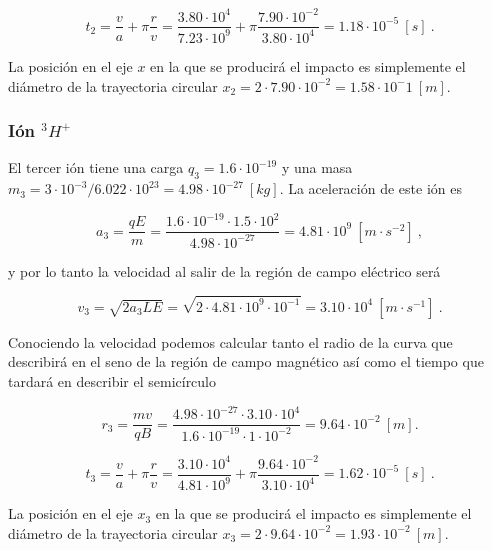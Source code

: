 \documentclass[journal]{IEEEtran}
\begin{document}
\begin{equation}
t_2 = \displaystyle\frac{v}{a} + \pi \displaystyle\frac{r}{v} = \displaystyle\frac{3.80 \cdot 10^4}{7.23 \cdot 10^{9}} + \pi \displaystyle\frac{7.90 \cdot 10^{-2}}{3.80 \cdot 10^4} = 1.18 \cdot 10^{-5}~[s]~.
\end{equation}

La posición en el eje $x$ en la que se producirá el impacto es simplemente el diámetro de la trayectoria circular $x_2 = 2\cdot7.90 \cdot 10^{-2} = 1.58 \cdot 10^-1~[m]$.

\subsubsection{Ión $^3H^+$}

El tercer ión tiene una carga $q_3 = 1.6\cdot 10^{-19}$ y una masa $m_3 = 3\cdot 10^{-3} / 6.022\cdot 10^{23} = 4.98\cdot 10^{-27}~[kg]$. La aceleración de este ión es

\begin{equation}
a_3 = \displaystyle\frac{qE}{m} = \displaystyle\frac{1.6\cdot 10^{-19}\cdot 1.5\cdot 10^{2}}{4.98\cdot 10^{-27}} = 4.81 \cdot 10^{9}~[m\cdot s^{-2}]~,
\end{equation}

y por lo tanto la velocidad al salir de la región de campo eléctrico será

\begin{equation}
v_3 = \sqrt{2a_3LE} = \sqrt{2\cdot 4.81 \cdot 10^{9} \cdot 10^{-1}} = 3.10 \cdot 10^4~[m\cdot s^{-1}]~.
\end{equation}

Conociendo la velocidad podemos calcular tanto el radio de la curva que describirá en el seno de la región de campo magnético así como el tiempo que tardará en describir el semicírculo

\begin{equation}
r_3 = \displaystyle\frac{mv}{qB} = \displaystyle\frac{4.98\cdot 10^{-27} \cdot 3.10\cdot 10^4}{1.6\cdot 10^{-19}\cdot 1 \cdot 10^{-2}} = 9.64\cdot 10^{-2}~[m].
\end{equation}

\begin{equation}
t_3 = \displaystyle\frac{v}{a} + \pi \displaystyle\frac{r}{v} = \displaystyle\frac{3.10 \cdot 10^4}{4.81 \cdot 10^{9}} + \pi \displaystyle\frac{9.64 \cdot 10^{-2}}{3.10 \cdot 10^4} = 1.62 \cdot 10^{-5}~[s]~.
\end{equation}

La posición en el eje $x_3$ en la que se producirá el impacto es simplemente el diámetro de la trayectoria circular $x_3 = 2\cdot9.64 \cdot 10^{-2} = 1.93 \cdot 10^{-2}~[m]$.
\end{document}
